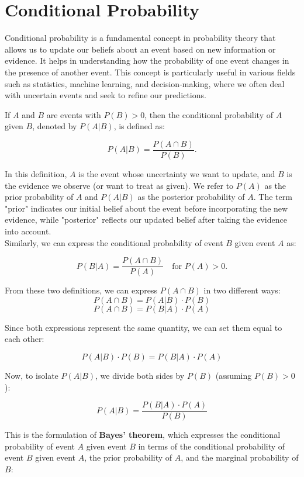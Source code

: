 \section{Conditional Probability}

Conditional probability is a fundamental concept in probability theory that allows us to update our beliefs about an event based on new information or evidence. It helps in understanding how the probability of one event changes in the presence of another event. This concept is particularly useful in various fields such as statistics, machine learning, and decision-making, where we often deal with uncertain events and seek to refine our predictions.

\begin{definition}  
If \( A \) and \( B \) are events with \( P(B) > 0 \), then the conditional probability of \( A \) given \( B \), denoted by \( P(A|B) \), is defined as:

\[
P(A|B) = \frac{P(A \cap B)}{P(B)}.
\]
\end{definition}

In this definition, \( A \) is the event whose uncertainty we want to update, and \( B \) is the evidence we observe (or want to treat as given). We refer to \( P(A) \) as the prior probability of \( A \) and \( P(A|B) \) as the posterior probability of \( A \). The term "prior" indicates our initial belief about the event before incorporating the new evidence, while "posterior" reflects our updated belief after taking the evidence into account.\\

Similarly, we can express the conditional probability of event \( B \) given event \( A \) as:

\[
P(B|A) = \frac{P(A \cap B)}{P(A)} \quad \text{for } P(A) > 0.
\]

From these two definitions, we can express \( P(A \cap B) \) in two different ways:
\[
P(A \cap B) = P(A|B) \cdot P(B)
\]
\[
P(A \cap B) = P(B|A) \cdot P(A)
\]

Since both expressions represent the same quantity, we can set them equal to each other:

\[
P(A|B) \cdot P(B) = P(B|A) \cdot P(A)
\]

Now, to isolate \( P(A|B) \), we divide both sides by \( P(B) \) (assuming \( P(B) > 0 \)):

\[
P(A|B) = \frac{P(B|A) \cdot P(A)}{P(B)}
\]

This is the formulation of \textbf{Bayes' theorem}, which expresses the conditional probability of event \( A \) given event \( B \) in terms of the conditional probability of event \( B \) given event \( A \), the prior probability of \( A \), and the marginal probability of \( B \):

